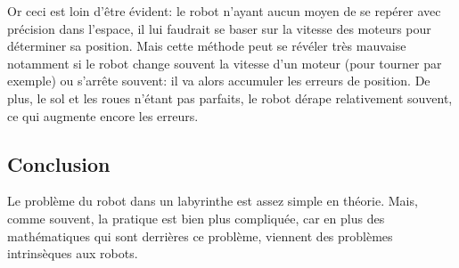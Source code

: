     Or ceci est loin d'être évident: le robot n'ayant aucun moyen de se repérer
    avec précision dans l'espace, il lui faudrait se baser sur la vitesse des
    moteurs pour déterminer sa position. Mais cette méthode peut se révéler
    très mauvaise notamment si le robot change souvent la vitesse d'un moteur
    (pour tourner par exemple) ou s'arrête souvent: il va alors accumuler les
    erreurs de position. De plus, le sol et les roues n'étant pas parfaits, le 
    robot dérape relativement souvent, ce qui augmente encore les erreurs.

  \subsection{Conclusion}
    Le problème du robot dans un labyrinthe est assez simple en théorie. Mais,
    comme souvent, la pratique est bien plus compliquée, car en plus des
    mathématiques qui sont derrières ce problème, viennent des problèmes
    intrinsèques aux robots.

